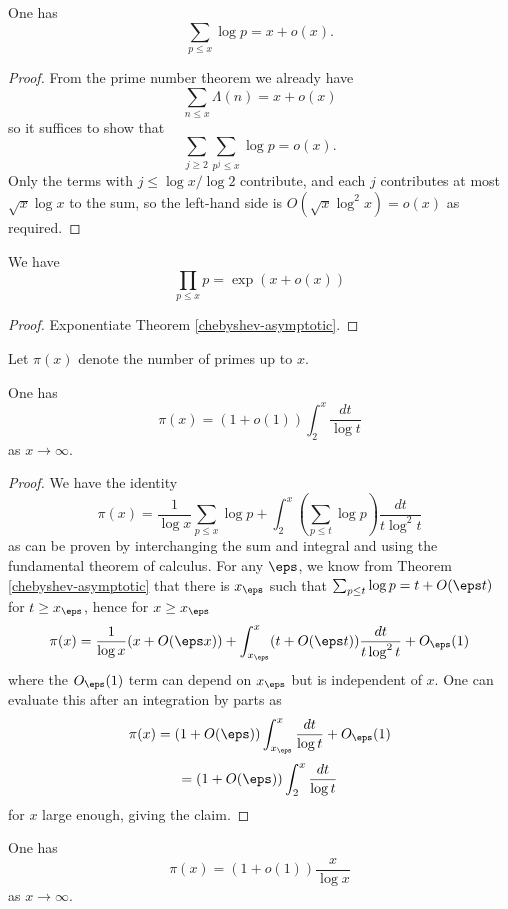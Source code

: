 
\begin{theorem}\label{chebyshev-asymptotic}  One has
  $$ \sum_{p \leq x} \log p = x + o(x).$$
\end{theorem}

\begin{proof}
From the prime number theorem we already have
$$ \sum_{n \leq x} \Lambda(n) = x + o(x)$$
so it suffices to show that
$$ \sum_{j \geq 2} \sum_{p^j \leq x} \log p = o(x).$$
Only the terms with $j \leq \log x / \log 2$ contribute, and each $j$ contributes at most $\sqrt{x} \log x$ to the sum, so the left-hand side is $O( \sqrt{x} \log^2 x ) = o(x)$ as required.
\end{proof}

\begin{corollary}  \label{primorial-bounds}
We have
  $$ \prod_{p \leq x} p = \exp( x + o(x) )$$
\end{corollary}

\begin{proof}
  Exponentiate Theorem \ref{chebyshev-asymptotic}.
\end{proof}

Let $\pi(x)$ denote the number of primes up to $x$.

\begin{theorem}\label{pi-asymp}  One has
  $$ \pi(x) = (1+o(1)) \int_2^x \frac{dt}{\log t}$$
as $x \to \infty$.
\end{theorem}

\begin{proof}
We have the identity
$$ \pi(x) = \frac{1}{\log x} \sum_{p \leq x} \log p
+ \int_2^x (\sum_{p \leq t} \log p) \frac{dt}{t \log^2 t}$$
as can be proven by interchanging the sum and integral and using the fundamental theorem of calculus.  For any $\eps$, we know from Theorem \ref{chebyshev-asymptotic} that there is $x_\eps$ such that
$\sum_{p \leq t} \log p = t + O(\eps t)$ for $t \geq x_\eps$, hence for $x \geq x_\eps$
$$ \pi(x) = \frac{1}{\log x} (x + O(\eps x))
+ \int_{x_\eps}^x (t + O(\eps t)) \frac{dt}{t \log^2 t} + O_\eps(1)$$
where the $O_\eps(1)$ term can depend on $x_\eps$ but is independent of $x$.  One can evaluate this after an integration by parts as
$$ \pi(x) = (1+O(\eps)) \int_{x_\eps}^x \frac{dt}{\log t} + O_\eps(1)$$
$$  = (1+O(\eps)) \int_{2}^x \frac{dt}{\log t} $$
for $x$ large enough, giving the claim.
\end{proof}

\begin{corollary}\label{pi-alt}  One has
$$ \pi(x) = (1+o(1)) \frac{x}{\log x}$$
as $x \to \infty$.
\end{corollary}

